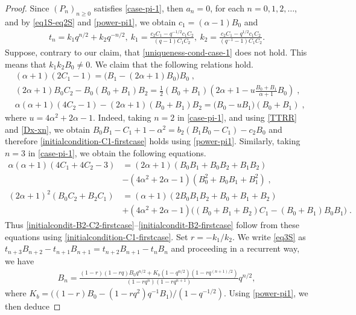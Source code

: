 \documentclass{amsart}
\theoremstyle{remark}
\numberwithin{equation}{section}
\begin{document}
\begin{proof}
Since $(P_n)_{n\geq0}$ satisfies \eqref{case-pi-1}, then $a_n =0$, for each $n=0,1,2,\ldots$, and by \eqref{eq1S-eq2S}  and \eqref{power-pi1}, we obtain $c_1=(\alpha-1)B_0$ and
\begin{align}
t_n =k_1q^{n/2}+k_2q^{-n/2},~ k_1 = \frac{c_2 C_1-q^{-1/2}c_1C_2}{(q-1)C_1C_2},~ k_2= \frac{c_2C_1-q^{1/2}c_1C_2}{(q^{-1}-1)C_1C_2} .\label{tn-pi-1}
\end{align}
Suppose, contrary to our claim, that \eqref{uniqueness-cond-case-1} does not hold. This means that $k_1k_2B_0\neq 0$. We claim that the following relations hold.
\begin{align}
&(\alpha+1)(2C_1-1)=\big(B_1-(2\alpha+1)B_0\big)B_0\;,\label{initialcondition-C1-firstcase}\\
&(2\alpha+1)B_0C_2 -B_0(B_0+B_1)B_2=\frac{1}{2}(B_0+B_1)\left(2\alpha+1 -u\frac{B_0+B_1}{\alpha+1}B_0  \right)\;,\label{initialcondit-B2-C2-firstcase}\\
&\alpha(\alpha+1)(4C_2-1)-(2\alpha+1)(B_0+B_1)B_2=\big(B_0-uB_1\big)(B_0+B_1)\;,\label{initialcondit-B2-firstcase}
\end{align}
where $u=4\alpha^2+2\alpha-1$. Indeed, taking $n=2$ in \eqref{case-pi-1}, and using \eqref{TTRR} and \eqref{Dx-xn}, we obtain $B_0B_1-C_1+1-\alpha^2=b_2(B_1B_0-C_1)-c_2B_0$ and therefore \eqref{initialcondition-C1-firstcase} holds using \eqref{power-pi1}. Similarly, taking $n=3$ in \eqref{case-pi-1}, we obtain the following equations.
\begin{align*}
\alpha(\alpha+1)(4C_1+4C_2-3)&=(2\alpha+1)(B_0B_1+B_0B_2+B_1B_2) \\
&-(4\alpha^2+2\alpha-1)(B_0^2+B_0B_1+B_1^2)\;,\\
(2\alpha+1)^2(B_0C_2+B_2C_1)&=(\alpha+1)(2B_0B_1B_2+B_0+B_1+B_2)\\
&+(4\alpha^2+2\alpha-1)\big((B_0+B_1+B_2)C_1-(B_0+B_1)B_0B_1\big)\;.
\end{align*}
Thus \eqref{initialcondit-B2-C2-firstcase}--\eqref{initialcondit-B2-firstcase} follow from these equations using \eqref{initialcondition-C1-firstcase}.
Set $r=-k_1/k_2$. We write \eqref{eq3S} as $t_{n+3}B_{n+2}-t_{n+1}B_{n+1}=t_{n+2}B_{n+1}-t_{n}B_{n}$ and proceeding in a recurrent way, we have 
\begin{align}\label{explicit-Bn-firstcase}
B_n =\frac{(1-r)(1-rq)B_0q^{n/2} +K_b(1-q^{n/2})(1-rq^{(n+1)/2})}{(1-rq^n)(1-rq^{n+1})}q^{n/2},
\end{align}
where $K_b=\big((1-r)B_0-(1-rq^2)q^{-1}B_1\big)/(1-q^{-1/2})$. Using \eqref{power-pi1}, we then deduce

\end{proof}
\end{document}
